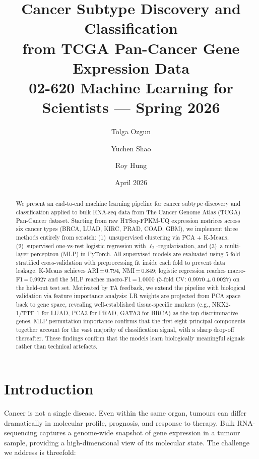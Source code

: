 \documentclass[11pt,letterpaper]{article}
\title{%
  \Large\textbf{Cancer Subtype Discovery and Classification}\\[4pt]
  \large from TCGA Pan-Cancer Gene Expression Data\\[6pt]
  \normalsize 02-620 Machine Learning for Scientists --- Spring 2026
}
\author{Tolga Ozgun \and Yuchen Shao \and Roy Hung}
\date{April 2026}
\begin{document}
\maketitle

\begin{abstract}
We present an end-to-end machine learning pipeline for cancer subtype
discovery and classification applied to bulk RNA-seq data from The Cancer
Genome Atlas (TCGA) Pan-Cancer dataset.  Starting from raw HTSeq-FPKM-UQ
expression matrices across six cancer types (BRCA, LUAD, KIRC, PRAD, COAD,
GBM), we implement three methods entirely from scratch: (1)~unsupervised
clustering via PCA + K-Means, (2)~supervised one-vs-rest logistic regression
with $\ell_2$-regularisation, and (3)~a multi-layer perceptron (MLP) in
PyTorch.  All supervised models are evaluated using 5-fold stratified
cross-validation with preprocessing fit inside each fold to prevent data
leakage.  K-Means achieves ARI\,=\,0.794, NMI\,=\,0.849; logistic regression
reaches macro-F1\,=\,0.9927 and the MLP reaches macro-F1\,=\,1.0000
(5-fold CV: $0.9970 \pm 0.0027$) on the held-out test set.  Motivated by TA feedback, we extend the pipeline with
biological validation via feature importance analysis: LR weights are projected
from PCA space back to gene space, revealing well-established tissue-specific
markers (e.g., NKX2-1/TTF-1 for LUAD, PCA3 for PRAD, GATA3 for BRCA) as the
top discriminative genes.  MLP permutation importance confirms that the first
eight principal components together account for the vast majority of
classification signal, with a sharp drop-off thereafter.  These findings
confirm that the models learn biologically meaningful signals rather than
technical artefacts.
\end{abstract}

\section{Introduction}
\label{sec:intro}

Cancer is not a single disease.  Even within the same organ, tumours can differ
dramatically in molecular profile, prognosis, and response to therapy.  Bulk
RNA-sequencing captures a genome-wide snapshot of gene expression in a tumour
sample, providing a high-dimensional view of its molecular state.  The
challenge we address is threefold:
\end{document}
